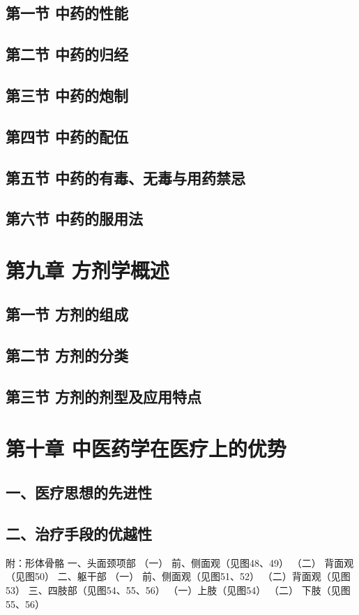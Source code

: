 \documentclass[a4paper,12pt,UTF8,twoside]{ctexbook}
\begin{document}
\section{第一节 中药的性能}
\section{第二节 中药的归经}
\section{第三节 中药的炮制}
\section{第四节 中药的配伍}
\section{第五节 中药的有毒、无毒与用药禁忌}
\section{第六节 中药的服用法}

\chapter{第九章 方剂学概述}
\section{第一节 方剂的组成}
\section{第二节 方剂的分类}
\section{第三节 方剂的剂型及应用特点}

\chapter{第十章 中医药学在医疗上的优势}
\section{一、医疗思想的先进性}
\section{二、治疗手段的优越性}


\backmatter

附：形体骨骼
一、头面颈项部
（一） 前、侧面观（见图48、49）
（二） 背面观（见图50）
二、躯干部
（一） 前、侧面观（见图51、52）
（二）背面观（见图53）
三、四肢部（见图54、55、56）
（一）上肢（见图54）
（二） 下肢（见图55、56）
\end{document}
